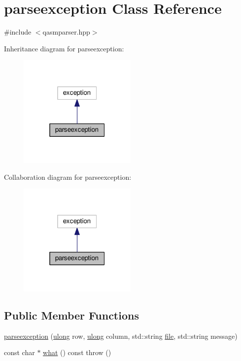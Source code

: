 \hypertarget{classparseexception}{}\section{parseexception Class Reference}
\label{classparseexception}


{\ttfamily \#include $<$qasmparser.\+hpp$>$}



Inheritance diagram for parseexception\+:\nopagebreak
\begin{figure}[H]
\begin{center}
\leavevmode
\includegraphics[width=163pt]{classparseexception__inherit__graph}
\end{center}
\end{figure}


Collaboration diagram for parseexception\+:\nopagebreak
\begin{figure}[H]
\begin{center}
\leavevmode
\includegraphics[width=163pt]{classparseexception__coll__graph}
\end{center}
\end{figure}
\subsection*{Public Member Functions}
\begin{DoxyCompactItemize}
\item 
\hyperlink{classparseexception_a16accd5bc62f4465b611b38db6751e0e}{parseexception} (\hyperlink{types_8h_ab2bb0e5480d1d957383df6b350794313}{ulong} row, \hyperlink{types_8h_ab2bb0e5480d1d957383df6b350794313}{ulong} column, std\+::string \hyperlink{classparseexception_a99a096bfed3e48cd365cdae1952bc017}{file}, std\+::string message)
\item 
const char $\ast$ \hyperlink{classparseexception_a006c6421028f780b91eb4a473265dce7}{what} () const   throw ()
\end{DoxyCompactItemize}
